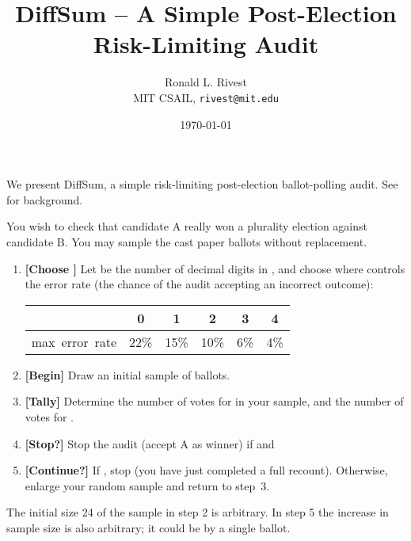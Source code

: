 \documentclass[twocolumn]{article}
\begin{document}


\title{{\sc DiffSum} -- A Simple Post-Election Risk-Limiting Audit}
\author{Ronald L. Rivest\\
  MIT CSAIL, {\texttt{rivest@mit.edu}}}
\date{\today}
\maketitle

\thispagestyle{empty}


We present {\sc DiffSum}, a simple risk-limiting post-election ballot-polling audit.
See~\cite{NBHC07,LindemanStYa12,LindemanSt12}
for background.

You wish to check that candidate A really won a plurality election against candidate B.
You may sample the  cast paper ballots without replacement.

\begin{leftbar}
\begin{enumerate}

\item {\bf [Choose ]} Let  be the number of decimal digits in , and
  choose  where  controls the error rate (the chance of the audit accepting
  an incorrect outcome):
\begin{tabular} {c|c|c|c|c|c}
                &  0   &  1   &  2   &  3   & 4 \\ \hline
      \hbox{max error rate} & 22\% & 15\% & 10\% &  6\% & 4\% 
    \end{tabular}


  \item {\bf [Begin]} Draw an initial sample of  ballots.

  \item {\bf [Tally]} Determine the number  of votes for  in your sample, and the number  of
    votes for .

  \item {\bf [Stop?]} Stop the audit (accept A as winner) if  and 
    

  \item {\bf [Continue?]} 
    If , stop (you have just completed a full recount).
    Otherwise, enlarge your random sample and return to step~3.
\end{enumerate}
\vspace{-0.15in}
\end{leftbar}

The initial size 24 of the sample in step 2 is arbitrary.
In step 5 the increase in sample size is also arbitrary; it could be by a
single ballot.
\end{document}
